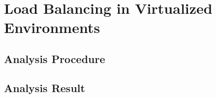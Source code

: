 \chapter{Load Balancing in Virtualized Environments}
\label{analysis_chapter}

\section{Analysis Procedure}
\label{anaproc}


\section{Analysis Result}
\label{neymanana}

